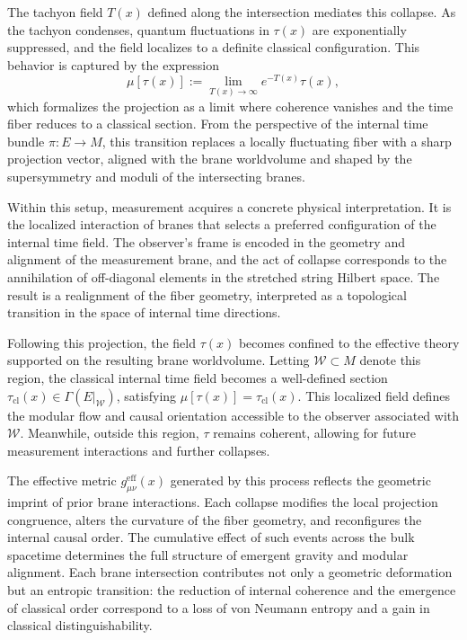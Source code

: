 \documentclass[11pt]{article}
\begin{document}
The tachyon field \( T(x) \) defined along the intersection mediates this collapse. As the tachyon condenses, quantum fluctuations in \( \tau(x) \) are exponentially suppressed, and the field localizes to a definite classical configuration. This behavior is captured by the expression
\begin{equation}
\mu[\tau(x)] := \lim_{T(x) \to \infty} e^{-T(x)} \tau(x),
\end{equation}
which formalizes the projection as a limit where coherence vanishes and the time fiber reduces to a classical section. From the perspective of the internal time bundle \( \pi: E \to M \), this transition replaces a locally fluctuating fiber with a sharp projection vector, aligned with the brane worldvolume and shaped by the supersymmetry and moduli of the intersecting branes.

Within this setup, measurement acquires a concrete physical interpretation. It is the localized interaction of branes that selects a preferred configuration of the internal time field. The observer’s frame is encoded in the geometry and alignment of the measurement brane, and the act of collapse corresponds to the annihilation of off-diagonal elements in the stretched string Hilbert space. The result is a realignment of the fiber geometry, interpreted as a topological transition in the space of internal time directions.

Following this projection, the field \( \tau(x) \) becomes confined to the effective theory supported on the resulting brane worldvolume. Letting \( \mathcal{W} \subset M \) denote this region, the classical internal time field becomes a well-defined section \( \tau_{\mathrm{cl}}(x) \in \Gamma(E|_{\mathcal{W}}) \), satisfying \( \mu[\tau(x)] = \tau_{\mathrm{cl}}(x) \). This localized field defines the modular flow and causal orientation accessible to the observer associated with \( \mathcal{W} \). Meanwhile, outside this region, \( \tau \) remains coherent, allowing for future measurement interactions and further collapses.

The effective metric \( g^{\mathrm{eff}}_{\mu\nu}(x) \) generated by this process reflects the geometric imprint of prior brane interactions. Each collapse modifies the local projection congruence, alters the curvature of the fiber geometry, and reconfigures the internal causal order. The cumulative effect of such events across the bulk spacetime determines the full structure of emergent gravity and modular alignment. Each brane intersection contributes not only a geometric deformation but an entropic transition: the reduction of internal coherence and the emergence of classical order correspond to a loss of von Neumann entropy and a gain in classical distinguishability.
\end{document}
